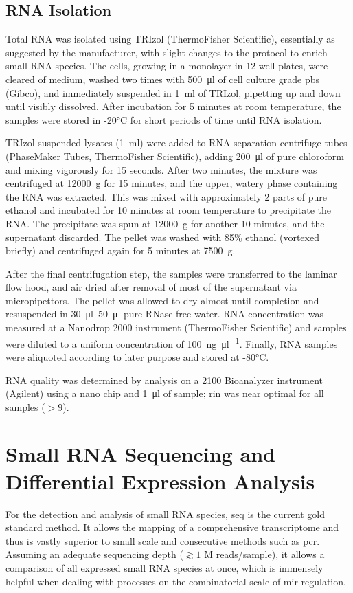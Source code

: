 \subsection{RNA Isolation}
Total RNA was isolated using TRIzol (ThermoFisher Scientific), essentially as suggested by the manufacturer, with slight changes to the protocol to enrich small RNA species. The cells, growing in a monolayer in 12-well-plates, were cleared of medium, washed two times with \SI{500}{\micro\litre} of cell culture grade \ac{pbs} (Gibco), and immediately suspended in \SI{1}{\milli\litre} of TRIzol, pipetting up and down until visibly dissolved. After incubation for 5 minutes at room temperature, the samples were stored in -20°C for short periods of time until RNA isolation.

TRIzol-suspended lysates (\SI{1}{\milli\litre}) were added to RNA-separation centrifuge tubes (PhaseMaker Tubes, ThermoFisher Scientific), adding \SI{200}{\micro\litre} of pure chloroform and mixing vigorously for 15 seconds. After two minutes, the mixture was centrifuged at \SI{12000}{\g} for 15 minutes, and the upper, watery phase containing the RNA was extracted. This was mixed with approximately 2 parts of pure ethanol and incubated for 10 minutes at room temperature to precipitate the RNA. The precipitate was spun at \SI{12000}{\g} for another 10 minutes, and the supernatant discarded. The pellet was washed with 85\% ethanol (vortexed briefly) and centrifuged again for 5 minutes at \SI{7500}{\g}.

After the final centrifugation step, the samples were transferred to the laminar flow hood, and air dried after removal of most of the supernatant via micropipettors. The pellet was allowed to dry almost until completion and resuspended in \SIrange{30}{50}{\micro\litre} pure RNase-free water. RNA concentration was measured at a Nanodrop 2000 instrument (ThermoFisher Scientific) and samples were diluted to a uniform concentration of \SI{100}{\nano\gram\per\micro\litre}. Finally, RNA samples were aliquoted according to later purpose and stored at -80°C.

RNA quality was determined by analysis on a 2100 Bioanalyzer instrument (Agilent) using a nano chip and \SI{1}{\micro\litre} of sample; \ac{rin} was near optimal for all samples ($> 9$).

\section{Small RNA Sequencing and Differential Expression Analysis}
For the detection and analysis of small RNA species, \ac{seq} is the current gold standard method. It allows the mapping of a comprehensive transcriptome and thus is vastly superior to small scale and consecutive methods such as \ac{pcr}. Assuming an adequate sequencing depth ($\gtrsim 1$ M reads/sample), it allows a comparison of all expressed small RNA species at once, which is immensely helpful when dealing with processes on the combinatorial scale of \ac{mir} regulation.


